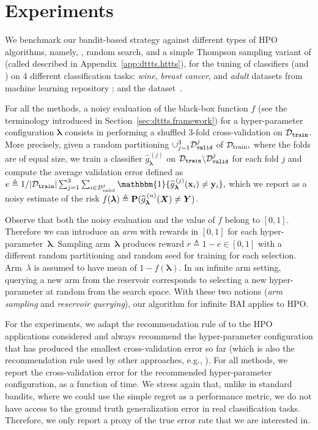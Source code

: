\section{Experiments}\label{sec:dttts.experiments}

We benchmark our bandit-based strategy against different types of HPO algorithms, namely, \TPE, random search, \Hyperband and a simple Thompson sampling variant of \Hyperband (called \HTTTS described in Appendix~\ref{app:dttts.httts}), for the tuning of classifiers (\SVM and \MLP) on 4 different classification tasks: \textit{wine}, \textit{breast cancer}, and \textit{adult} datasets from \UCI machine learning repository \citep{dua2017}; and the \MNIST dataset~\citep{lecun1998gradient}.

For all the methods, a noisy evaluation of the black-box function $f$ (see the terminology introduced in Section~\ref{sec:dttts.framework}) for a hyper-parameter configuration $\bm\lambda$ consists in performing a shuffled 3-fold cross-validation on $\mathcal{D}_{\texttt{train}}$. More precisely, given a random partitioning $\cup_{j=1}^3\mathcal{D}_{\texttt{valid}}^j$ of $\mathcal{D}_{\text{train}},$ where the folds are of equal size, we train a classifier $\hat{g}^{\,(j)}_{\bm\lambda}$ on $\mathcal{D}_{\texttt{train}} \backslash \mathcal{D}_{\texttt{valid}}^j$ for each fold $j$ and compute the average validation error defined as $e \triangleq 1/|\cD_{\texttt{train}}|\sum_{j=1}^{3} \sum_{i \in \cD_{\text{valid}}^j} \mathbbm{1}\{\hat{g}^{\,(j)}_{\blambda}(\bx_i)\neq\by_i\},$ which we report as a noisy estimate of the risk $f(\bm\lambda) \triangleq {\bf P}(\widehat{g}^{\,(n)}_{\bm\lambda}(\bm X) \neq \bm Y)$.

Observe that both the noisy evaluation and the value of $f$ belong to $[0,1]$. Therefore we can introduce an \textit{arm} with rewards in $[0,1]$ for each hyper-parameter~$\bm\lambda$. Sampling  arm~$\bm\lambda$ produces reward $r \triangleq 1-e \in [0,1]$ with a different random partitioning and random seed for training for each selection. Arm~$\lambda$ is assumed to have mean of $1-f(\bm\lambda)$. In an infinite arm setting, querying a new arm from the reservoir corresponds to selecting a new hyper-parameter at random from the search space. With these two notions (\textit{arm sampling} and \textit{reservoir querying}), our algorithm for infinite BAI applies to HPO.  

For the experiments, we adapt the recommendation rule of \DTTTS to the HPO applications considered and always recommend the hyper-parameter configuration that has produced the smallest cross-validation error so far (which is also the recommendation rule used by other approaches, e.g., \Hyperband). For all methods, we report the cross-validation error for the recommended hyper-parameter configuration, as a function of time. We stress again that, unlike in standard bandits, where we could use the simple regret as a performance metric, we do not have access to the ground truth generalization error in real classification tasks. Therefore, we only report a proxy of the true error rate that we are interested in.


